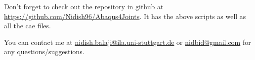 \documentclass[11pt]{article}
\begin{document}
Don't forget to check out the repository in github at \href{https://github.com/Nidish96/Abaqus4Joints/blob/main/assets/assembly/model\_step3.cae}{https://github.com/Nidish96/Abaqus4Joints}.
It has the above scripts as well as all the cae files.

You can contact me at \href{mailto:nidish.balaji@ila.uni-stuttgart.de}{nidish.balaji@ila.uni-stuttgart.de} or \href{mailto:nidbid@gmail.com}{nidbid@gmail.com} for any questions/suggestions.
\end{document}
